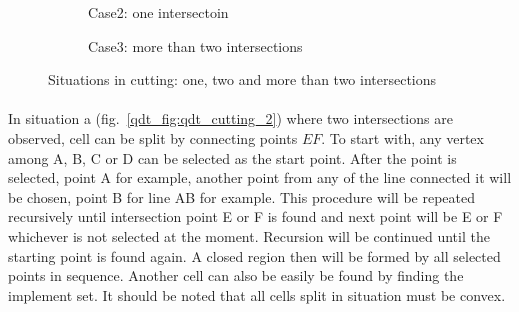\begin{figure}[h!]
\begin{subfigure}[b]{0.3\linewidth}
        \caption{Case2: one intersectoin}
    \end{subfigure}
    \begin{subfigure}[b]{0.3\linewidth}
        \caption{Case3: more than two intersections}
        \label{qdt_fig:qdt_cutting_3}
    \end{subfigure}
    \caption[Situations in cutting]{Situations in cutting: one, two and more than two intersections}
    \label{qdt_fig:qdt_cutting}
\end{figure}

\paragraph{}
In situation a (fig.~\ref{qdt_fig:qdt_cutting_2}) where two intersections are observed, cell can be split by connecting points $EF$.
To start with, any vertex among A, B, C or D can be selected as the start point.
After the point is selected, point A for example, another point from any of the line connected it will be chosen, point B for line AB for example.
This procedure will be repeated recursively until intersection point E or F is found and next point will be E or F whichever is not selected at the moment.
Recursion will be continued until the starting point is found again.
A closed region then will be formed by all selected points in sequence.
Another cell can also be easily be found by finding the implement set.
It should be noted that all cells split in situation must be convex.

